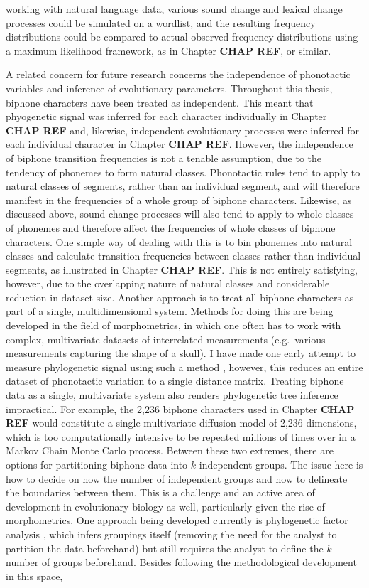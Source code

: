 working with natural language data, various sound change and lexical change processes could be simulated on a wordlist, and the resulting frequency distributions could be compared to actual observed frequency distributions using a maximum likelihood framework, as in Chapter \textbf{CHAP REF}, or similar.

A related concern for future research concerns the independence of phonotactic variables and inference of evolutionary parameters. Throughout this thesis, biphone characters have been treated as independent. This meant that phyogenetic signal was inferred for each character individually in Chapter \textbf{CHAP REF} and, likewise, independent evolutionary processes were inferred for each individual character in Chapter \textbf{CHAP REF}. However, the independence of biphone transition frequencies is not a tenable assumption, due to the tendency of phonemes to form natural classes. Phonotactic rules tend to apply to natural classes of segments, rather than an individual segment, and will therefore manifest in the frequencies of a whole group of biphone characters. Likewise, as discussed above, sound change processes will also tend to apply to whole classes of phonemes and therefore affect the frequencies of whole classes of biphone characters. One simple way of dealing with this is to bin phonemes into natural classes and calculate transition frequencies between classes rather than individual segments, as illustrated in Chapter \textbf{CHAP REF}. This is not entirely satisfying, however, due to the overlapping nature of natural classes and considerable reduction in dataset size. Another approach is to treat all biphone characters as part of a single, multidimensional system. Methods for doing this are being developed in the field of morphometrics, in which one often has to work with complex, multivariate datasets of interrelated measurements (e.g.~various measurements capturing the shape of a skull). I have made one early attempt to measure phylogenetic signal using such a method \autocite{macklin-cordes_phylogeny_2018}, however, this reduces an entire dataset of phonotactic variation to a single distance matrix. Treating biphone data as a single, multivariate system also renders phylogenetic tree inference impractical. For example, the 2,236 biphone characters used in Chapter \textbf{CHAP REF} would constitute a single multivariate diffusion model of 2,236 dimensions, which is too computationally intensive to be repeated millions of times over in a Markov Chain Monte Carlo process. Between these two extremes, there are options for partitioning biphone data into \(k\) independent groups. The issue here is how to decide on how the number of independent groups and how to delineate the boundaries between them. This is a challenge and an active area of development in evolutionary biology as well, particularly given the rise of morphometrics. One approach being developed currently is phylogenetic factor analysis \autocites{tolkoff_phylogenetic_2018}{hassler_inferring_2020}, which infers groupings itself (removing the need for the analyst to partition the data beforehand) but still requires the analyst to define the \(k\) number of groups beforehand. Besides following the methodological development in this space, 